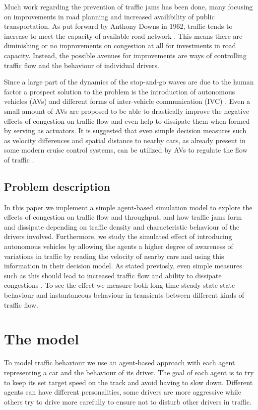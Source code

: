 \documentclass[11pt,a4paper,twocolumn]{article}
\begin{document}
Much work regarding the prevention of traffic jams has been done, many focusing on improvements in road planning and increased availibility of public transportation. As put forward by Anthony Downs in 1962, traffic tends to increase to meet the capacity of available road network \cite{downs2000stuck, downs2005still, downs1962law}. This means there are diminishing or no improvements on congestion at all for investments in road capacity. Instead, the possible avenues for improvements are ways of controlling traffic flow and the behaviour of individual drivers.

Since a large part of the dynamics of the stop-and-go waves are due to the human factor a prospect solution to the problem is the introduction of autonomous vehicles (AVs) and different forms of inter-vehicle communication (IVC) \cite{stern17autonomous, darbha1999cruisecontrol, bauza2013vehicle2vehicle, fagnant2015autonomous}. Even a small amount of AVs are proposed to be able to drastically improve the negative effects of congestion on traffic flow and even help to dissipate them when formed by serving as actuators. It is suggested that even simple decision measures such as velocity differences and spatial distance to nearby cars, as already present in some modern cruise control systems, can be utilized by AVs to regulate the flow of traffic \cite{stern17autonomous}.
\subsection{Problem description}
In this paper we implement a simple agent-based simulation model to explore the effects of congestion on traffic flow and throughput, and how traffic jams form and dissipate depending on traffic density and characteristic behaviour of the drivers involved. Furthermore, we study the simulated effect of introducing autonomous vehicles by allowing the agents a higher degree of awareness of variations in traffic by reading the velocity of nearby cars and using this information in their decision model. As stated previosly, even simple measures such as this should lead to increased traffic flow and ability to dissipate congestions \cite{stern17autonomous}. To see the effect we measure both long-time steady-state state behaviour and instantaneous behaviour in transients between different kinds of traffic flow.

\section{The model}
To model traffic behaviour we use an agent-based approach with each agent representing a car and the behaviour of its driver. The goal of each agent is to try to keep its set target speed on the track and avoid having to slow down. Different agents can have different personalities, some drivers are more aggressive while others try to drive more carefully to ensure not to disturb other drivers in traffic.
\end{document}
